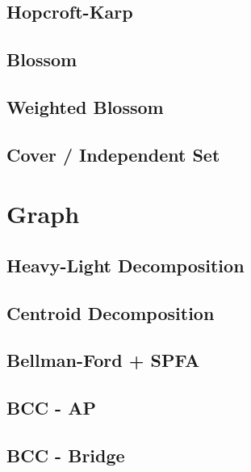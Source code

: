 \documentclass[a4paper,10pt,twocolumn,oneside,x11names]{article}
\begin{document}
\subsection{Hopcroft-Karp}


\subsection{Blossom}


\subsection{Weighted Blossom}


\subsection{Cover / Independent Set}



\section{Graph}

\subsection{Heavy-Light Decomposition}


\subsection{Centroid Decomposition}


\subsection{Bellman-Ford + SPFA}


\subsection{BCC - AP}


\subsection{BCC - Bridge}

\end{document}
